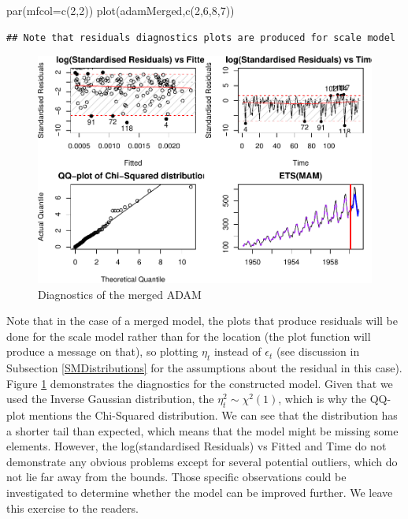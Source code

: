 \documentclass[
]{book}
\newenvironment{Shaded}{\begin{snugshade}}{\end{snugshade}}
\newcommand{\AttributeTok}[1]{\textcolor[rgb]{0.77,0.63,0.00}{#1}}
\newcommand{\DecValTok}[1]{\textcolor[rgb]{0.00,0.00,0.81}{#1}}
\newcommand{\FunctionTok}[1]{\textcolor[rgb]{0.00,0.00,0.00}{#1}}
\newcommand{\NormalTok}[1]{#1}
\theoremstyle{definition}
\theoremstyle{definition}
\theoremstyle{definition}
\theoremstyle{definition}
\theoremstyle{remark}
\begin{document}
\begin{Shaded}
\begin{Highlighting}[]
\FunctionTok{par}\NormalTok{(}\AttributeTok{mfcol=}\FunctionTok{c}\NormalTok{(}\DecValTok{2}\NormalTok{,}\DecValTok{2}\NormalTok{))}
\FunctionTok{plot}\NormalTok{(adamMerged,}\FunctionTok{c}\NormalTok{(}\DecValTok{2}\NormalTok{,}\DecValTok{6}\NormalTok{,}\DecValTok{8}\NormalTok{,}\DecValTok{7}\NormalTok{))}
\end{Highlighting}
\end{Shaded}

\begin{verbatim}
## Note that residuals diagnostics plots are produced for scale model
\end{verbatim}

\begin{figure}
\centering
\includegraphics{Svetunkov--2022----ADAM_files/figure-latex/adamModelAirMergedDiagnostics-1.pdf}
\caption{\label{fig:adamModelAirMergedDiagnostics}Diagnostics of the merged ADAM}
\end{figure}

Note that in the case of a merged model, the plots that produce residuals will be done for the scale model rather than for the location (the plot function will produce a message on that), so plotting \(\eta_t\) instead of \(\epsilon_t\) (see discussion in Subsection \ref{SMDistributions} for the assumptions about the residual in this case). Figure \ref{fig:adamModelAirMergedDiagnostics} demonstrates the diagnostics for the constructed model. Given that we used the Inverse Gaussian distribution, the \(\eta_t^2 \sim \chi^2(1)\), which is why the QQ-plot mentions the Chi-Squared distribution. We can see that the distribution has a shorter tail than expected, which means that the model might be missing some elements. However, the log(standardised Residuals) vs Fitted and Time do not demonstrate any obvious problems except for several potential outliers, which do not lie far away from the bounds. Those specific observations could be investigated to determine whether the model can be improved further. We leave this exercise to the readers.
\end{document}
